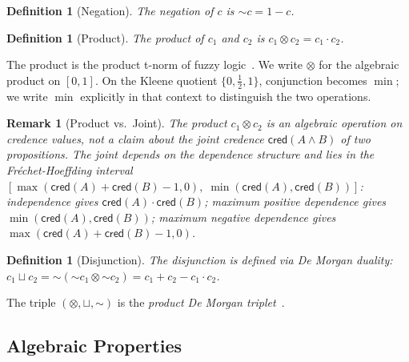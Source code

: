 \documentclass[11pt,a4paper]{article}
\newtheorem{definition}[theorem]{Definition}
\newtheorem{remark}[theorem]{Remark}
\newcommand{\cred}{\mathsf{cred}}
\newcommand{\negc}{\mathord{\sim}}
\newcommand{\conjc}{\otimes}
\newcommand{\disjc}{\sqcup}
\begin{document}
\begin{definition}[Negation]
\label{def:neg}
The \emph{negation} of $c$ is $\negc c = 1 - c$.
\end{definition}

\begin{definition}[Product]
\label{def:conj}
The \emph{product} of $c_1$ and $c_2$ is $c_1 \conjc c_2 = c_1 \cdot c_2$.
\end{definition}

The product is the product t-norm of fuzzy logic~\cite{klement2000}.
We write $\conjc$ for the algebraic product on $[0,1]$.
On the Kleene quotient $\{0, \tfrac{1}{2}, 1\}$, conjunction becomes
$\min$; we write $\min$ explicitly in that context to distinguish the
two operations.

\begin{remark}[Product vs.\ Joint]
\label{rem:product-vs-joint}
The product $c_1 \conjc c_2$ is an algebraic operation on credence
values, not a claim about the joint credence
$\cred(A \land B)$ of two propositions.
The joint depends on the dependence structure and lies in the
Fr\'echet-Hoeffding interval
$[\max(\cred(A) + \cred(B) - 1, 0),\; \min(\cred(A), \cred(B))]$:
independence gives $\cred(A) \cdot \cred(B)$;
maximum positive dependence gives $\min(\cred(A), \cred(B))$;
maximum negative dependence gives $\max(\cred(A) + \cred(B) - 1, 0)$.
\end{remark}

\begin{definition}[Disjunction]
\label{def:disj}
The \emph{disjunction} is defined via De Morgan duality:
$c_1 \disjc c_2 = \negc(\negc c_1 \conjc \negc c_2)
  = c_1 + c_2 - c_1 \cdot c_2$.
\end{definition}

The triple $(\conjc, \disjc, \negc)$ is the \emph{product De Morgan
triplet}~\cite{klement2000,hajek1998}.

\subsection{Algebraic Properties}
\end{document}
